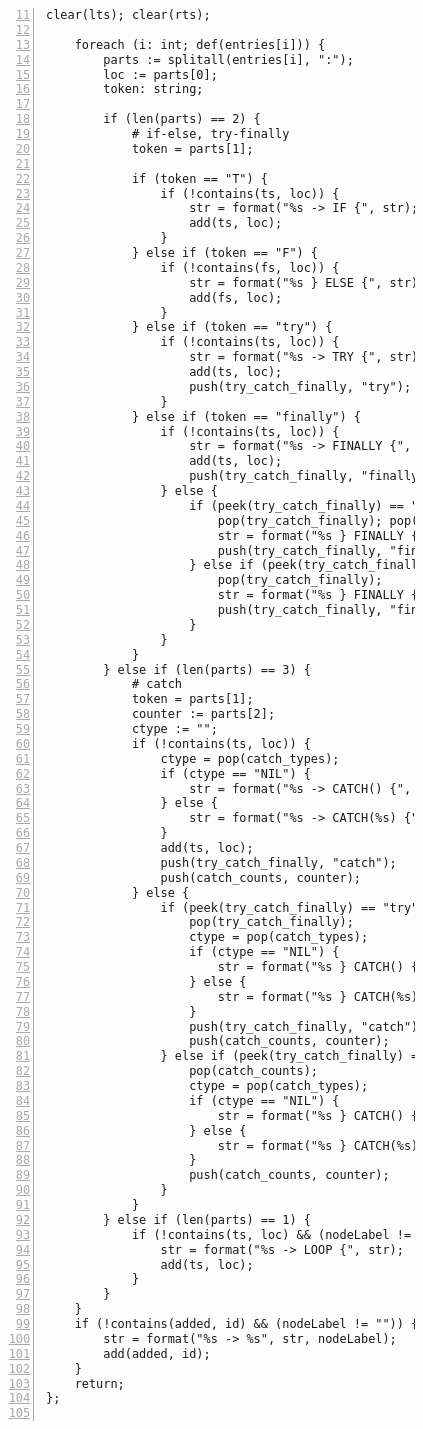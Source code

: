 \begin{figure}[ht!]
\begin{lstlisting}[numbers=left, tabsize=4, escapechar=@, caption={API Usage Mining Analysis},label={lst:aun-code}, firstline = 11, firstnumber = 11, lastline = 60]
	clear(lts); clear(rts);
		
	foreach (i: int; def(entries[i])) {
		parts := splitall(entries[i], ":");
		loc := parts[0];
		token: string;
		
		if (len(parts) == 2) {
			# if-else, try-finally
			token = parts[1];
				
			if (token == "T") {
				if (!contains(ts, loc)) {
					str = format("%s -> IF {", str);
					add(ts, loc);
				}
			} else if (token == "F") {
				if (!contains(fs, loc)) {
					str = format("%s } ELSE {", str);
					add(fs, loc); 
				}
			} else if (token == "try") {
				if (!contains(ts, loc)) {
					str = format("%s -> TRY {", str);
					add(ts, loc);
					push(try_catch_finally, "try");
				}
			} else if (token == "finally") {
				if (!contains(ts, loc)) {
					str = format("%s -> FINALLY {", str);
					add(ts, loc);
					push(try_catch_finally, "finally");
				} else {
					if (peek(try_catch_finally) == "catch") {
						pop(try_catch_finally); pop(catch_counts);
						str = format("%s } FINALLY {", str);
						push(try_catch_finally, "finally");
					} else if (peek(try_catch_finally) == "try") {
					    pop(try_catch_finally);
					    str = format("%s } FINALLY {", str);
					    push(try_catch_finally, "finally");
					}
				}
			} 
		} else if (len(parts) == 3) {
			# catch
			token = parts[1];
			counter := parts[2];
			ctype := "";
			if (!contains(ts, loc)) {
			    ctype = pop(catch_types);
			    if (ctype == "NIL") {
				    str = format("%s -> CATCH() {", str);
			    } else {
			        str = format("%s -> CATCH(%s) {", str, ctype);
			    }
				add(ts, loc);
				push(try_catch_finally, "catch");
				push(catch_counts, counter);
			} else {
				if (peek(try_catch_finally) == "try") {
					pop(try_catch_finally);
					ctype = pop(catch_types);
			        if (ctype == "NIL") {
			            str = format("%s } CATCH() {", str);    
			        } else {
			            str = format("%s } CATCH(%s) {", str, ctype);    
			        }
					push(try_catch_finally, "catch");
					push(catch_counts, counter);
				} else if (peek(try_catch_finally) == "catch" && peek(catch_counts) != counter) {
					pop(catch_counts);
					ctype = pop(catch_types);
			        if (ctype == "NIL") {
			            str = format("%s } CATCH() {", str);    
			        } else {
			            str = format("%s } CATCH(%s) {", str, ctype);    
			        }
					push(catch_counts, counter);
				}
			}
		} else if (len(parts) == 1) {
			if (!contains(ts, loc) && (nodeLabel != "")) {
				str = format("%s -> LOOP {", str);
				add(ts, loc);
			}
		} 
	}
	if (!contains(added, id) && (nodeLabel != "")) {
        str = format("%s -> %s", str, nodeLabel);
        add(added, id);
    }
	return;
};


\end{lstlisting}
\end{figure}
